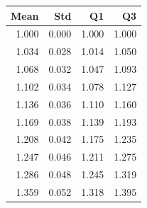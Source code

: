 \begin{tabular}{rrrr}
\toprule
Mean & Std & Q1 & Q3 \\
\midrule
1.000 & 0.000 & 1.000 & 1.000 \\
1.034 & 0.028 & 1.014 & 1.050 \\
1.068 & 0.032 & 1.047 & 1.093 \\
1.102 & 0.034 & 1.078 & 1.127 \\
1.136 & 0.036 & 1.110 & 1.160 \\
1.169 & 0.038 & 1.139 & 1.193 \\
1.208 & 0.042 & 1.175 & 1.235 \\
1.247 & 0.046 & 1.211 & 1.275 \\
1.286 & 0.048 & 1.245 & 1.319 \\
1.359 & 0.052 & 1.318 & 1.395 \\
\bottomrule
\end{tabular}
